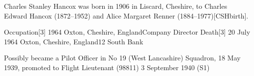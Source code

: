 
Charles Stanley Hancox was born in 1906 in Liscard, Cheshire, to Charles Edward Hancox (1872--1952) and Alice Margaret Renner (1884--1977)[CSHbirth].

Occupation[3] 	1964 	Oxton, Cheshire, EnglandCompany Director
Death[3] 	20 July 1964 	Oxton, Cheshire, England12 South Bank

Possibly became a Pilot Officer in No 19 (West Lancashire) Squadron, 18 May 1939, promoted to Flight Lieutenant (98811) 3 September 1940 (S1)
